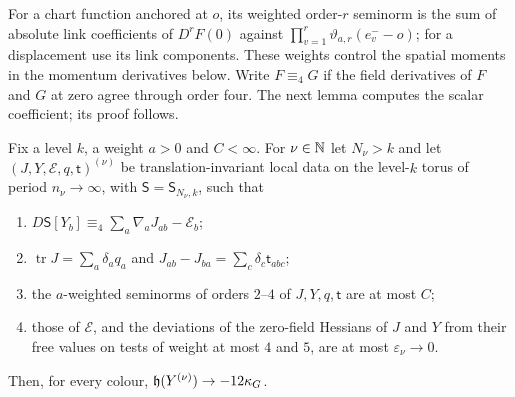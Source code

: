 For a chart function anchored at $o$, its weighted order-$r$ seminorm is the sum of absolute link coefficients of $D^rF(0)$ against $\prod_{v=1}^r\vartheta_{a,r}(e_v^--o)$; for a displacement use its link components. These weights control the spatial moments in the momentum derivatives below. Write $F\equiv_4G$ if the field derivatives of $F$ and $G$ at zero agree through order four. The next lemma computes the scalar coefficient; its proof follows.
\begin{lemma}\label{lem:I-regulator}
Fix a level $k$, a weight $a>0$ and $C<\infty$. For $\nu\in\mathbb{N}$ let $N_\nu>k$ and let $(J,Y,\mathcal E,q,\mathsf t)^{(\nu)}$ be translation-invariant local data on the level-$k$ torus of period $n_\nu\to\infty$, with $\mathsf S=\mathsf S_{N_\nu,k}$, such that
\begin{enumerate}[label=(\alph*)]
\item $D\mathsf S[Y_b]\equiv_4\sum_a\nabla_aJ_{ab}-\mathcal E_b$;
\item $\operatorname{tr}J=\sum_a\delta_aq_a$ and $J_{ab}-J_{ba}=\sum_c\delta_c\mathsf t_{abc}$;
\item the $a$-weighted seminorms of orders $2$--$4$ of $J,Y,q,\mathsf t$ are at most $C$;
\item those of $\mathcal E$, and the deviations of the zero-field Hessians of $J$ and $Y$ from their free values on tests of weight at most $4$ and $5$, are at most $\varepsilon_\nu\to0$.
\end{enumerate}
Then, for every colour, $\mathfrak h(Y^{(\nu)})\to-12\kappa_G$.
\end{lemma}
